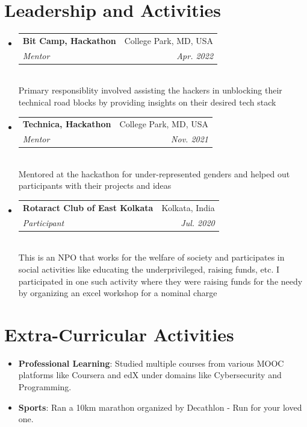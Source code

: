 \documentclass[letterpaper,11pt]{article}
\makeatletter
\newcommand{\resumeSubheading}[4]{
  \vspace{-2pt}\item
    \begin{tabular*}{0.97\textwidth}[t]{l@{\extracolsep{\fill}}r}
      \textbf{#1} & #2 \\
      \textit{\small#3} & \textit{\small #4} \\
    \end{tabular*}\vspace{-7pt}
}
\newcommand{\resumeSubHeadingListStart}{\begin{itemize}[leftmargin=0.15in, label={}]}
\newcommand{\resumeSubHeadingListEnd}{\end{itemize}}
\makeatother
\begin{document}
\section{Leadership and Activities}
 \resumeSubHeadingListStart
  \resumeSubheading
     {Bit Camp, Hackathon}{College Park, MD, USA}
     {Mentor}{Apr. 2022} \vspace{2px} \\
     {Primary responsiblity involved assisting the hackers in unblocking their technical road blocks by providing insights on their desired tech stack}
  \resumeSubheading
     {Technica, Hackathon}{College Park, MD, USA}
     {Mentor}{Nov. 2021} \vspace{2px} \\
     {Mentored at the hackathon for under-represented genders and helped out participants with their projects and ideas}
  \resumeSubheading
     {Rotaract Club of East Kolkata}{Kolkata, India}
     {Participant}{Jul. 2020} \vspace{2px} \\
     {This is an NPO that works for the welfare of society and participates in social activities like educating the underprivileged, raising funds, etc. I participated in one such activity where they were raising funds for the needy by organizing an excel workshop for a nominal charge}
 \resumeSubHeadingListEnd

\section{Extra-Curricular Activities}
 \begin{itemize}
     \item { \textbf {Professional Learning}{: Studied multiple courses from various MOOC platforms like Coursera and edX under domains like Cybersecurity and Programming.}}
     \item {\textbf {Sports}{: Ran a 10km marathon organized by Decathlon - Run for your loved one.}}
 \end{itemize}

\end{document}
